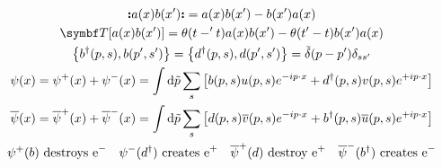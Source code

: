 \begin{gather*}
        \nord{a(x)b(x')} = a(x)b(x') - b(x')a(x)
        \\
        \Tordp{a(x)b(x')} = \theta(t-'t)a(x)b(x') - \theta(t'-t)b(x')a(x)
        \\
        \qty{b^\dagger\qty(p,s),b\qty(p',s')}
        = \qty{d^\dagger\qty(p,s),d\qty(p',s')}
        = \Tilde{\delta}\qty(p-p')\delta_{ss'}
        \\
        \psi(x)
        = \psi^+(x) + \psi^-(x)
        = \int\dd{\Tilde{p}}\sum_s \qty[b(p,s)u(p,s)e^{-ip\cdot x} + d^\dagger(p,s)v(p,s)e^{+ip\cdot x}]
        \\
        \overline{\psi}(x)
        = \overline{\psi}^+(x) + \overline{\psi}^-(x)
        = \int\dd{\Tilde{p}}\sum_s \qty[d(p,s)\overline{v}(p,s)e^{-ip\cdot x} + b^\dagger(p,s)\overline{u}(p,s)e^{+ip\cdot x}]
        \\
        \psi^+(b) \text{ destroys } \ce{e^-}
        \quad
        \psi^-(d^\dagger) \text{ creates } \ce{e^+}
        \quad
        \overline{\psi}^+(d) \text{ destroy } \ce{e^+}
        \quad
        \overline{\psi}^-(b^\dagger) \text{ creates } \ce{e^-}
\end{gather*}
